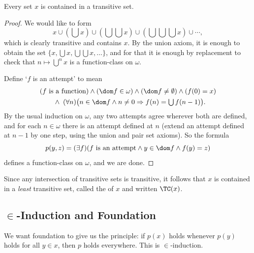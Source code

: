 \begin{lemma}\label{lem:transclosure}
  Every set $x$ is contained in a transitive set.
\end{lemma}
\begin{proof}
  We would like to form
  $$
  x \cup \left(\bigcup x\right)\cup \left(\bigcup \bigcup x\right)\cup \left(\bigcup\bigcup\bigcup x\right)\cup \cdots,
  $$
  which is clearly transitive and contains $x$. By the union axiom, it is enough to obtain the set $\{x, \bigcup x, \bigcup\bigcup x, \dots\}$, and for that it is enough by replacement to check that $n \mapsto \bigcup^n x$ is a function-class on $\omega$.

  Define `$f$ is an attempt' to mean
  \begin{align*}
    &(f \text{ is a function}) \land (\dom f \in \omega) \land (\dom f \neq \emptyset) \land (f(0) = x) \\
    &\qquad \land \; (\forall n)\bigl(n \in \dom f \land n \neq 0 \Rightarrow f(n) = \textstyle\bigcup f(n-1)\bigr).
  \end{align*}
  By the usual induction on $\omega$, any two attempts agree wherever both are defined, and for each $n \in \omega$ there is an attempt defined at $n$ (extend an attempt defined at $n - 1$ by one step, using the union and pair set axioms). So the formula
  $$p(y, z) = (\exists f)(f \text{ is an attempt} \land y \in \dom f \land f(y) = z)$$
  defines a function-class on $\omega$, and we are done.
\end{proof}

Since any intersection of transitive sets is transitive, it follows that $x$ is contained in a \emph{least} transitive set, called the  of $x$ and written $\TC(x)$.

\subsection{\texorpdfstring{$\in$}{Epsilon}-Induction and Foundation}

We want foundation to give us the principle: if $p(x)$ holds whenever $p(y)$ holds for all $y \in x$, then $p$ holds everywhere. This is $\in$-induction.

